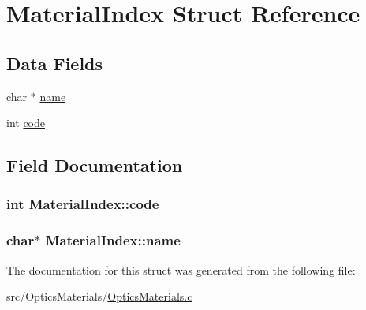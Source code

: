 \hypertarget{structMaterialIndex}{\section{Material\+Index Struct Reference}
\label{structMaterialIndex}
}
\subsection*{Data Fields}
\begin{DoxyCompactItemize}
\item 
char $\ast$ \hyperlink{structMaterialIndex_a9a1c2042061f01de2a32002bd779a630}{name}
\item 
int \hyperlink{structMaterialIndex_a7b54b40a48c454c51cc0403b571dce15}{code}
\end{DoxyCompactItemize}


\subsection{Field Documentation}
\hypertarget{structMaterialIndex_a7b54b40a48c454c51cc0403b571dce15}{
\subsubsection[{code}]{\setlength{\rightskip}{0pt plus 5cm}int Material\+Index\+::code}}\label{structMaterialIndex_a7b54b40a48c454c51cc0403b571dce15}
\hypertarget{structMaterialIndex_a9a1c2042061f01de2a32002bd779a630}{
\subsubsection[{name}]{\setlength{\rightskip}{0pt plus 5cm}char$\ast$ Material\+Index\+::name}}\label{structMaterialIndex_a9a1c2042061f01de2a32002bd779a630}


The documentation for this struct was generated from the following file\+:\begin{DoxyCompactItemize}
\item 
src/\+Optics\+Materials/\hyperlink{OpticsMaterials_8c}{Optics\+Materials.\+c}\end{DoxyCompactItemize}
